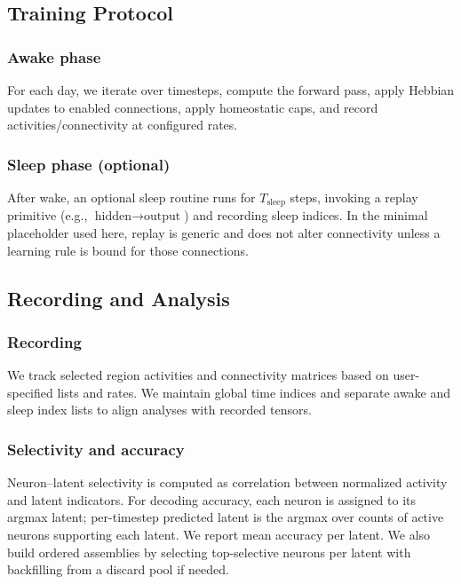 \documentclass{article}
\begin{document}
\subsection*{Training Protocol}
\subsubsection*{Awake phase}
For each day, we iterate over timesteps, compute the forward pass, apply Hebbian updates to enabled connections, apply homeostatic caps, and record activities/connectivity at configured rates.

\subsubsection*{Sleep phase (optional)}
After wake, an optional sleep routine runs for $T_{\text{sleep}}$ steps, invoking a replay primitive (e.g., $\text{hidden}\to\text{output}$) and recording sleep indices. In the minimal placeholder used here, replay is generic and does not alter connectivity unless a learning rule is bound for those connections.

\subsection*{Recording and Analysis}
\subsubsection*{Recording}
We track selected region activities and connectivity matrices based on user-specified lists and rates. We maintain global time indices and separate awake and sleep index lists to align analyses with recorded tensors.

\subsubsection*{Selectivity and accuracy}
Neuron–latent selectivity is computed as correlation between normalized activity and latent indicators. For decoding accuracy, each neuron is assigned to its argmax latent; per-timestep predicted latent is the argmax over counts of active neurons supporting each latent. We report mean accuracy per latent. We also build ordered assemblies by selecting top-selective neurons per latent with backfilling from a discard pool if needed.
\end{document}
